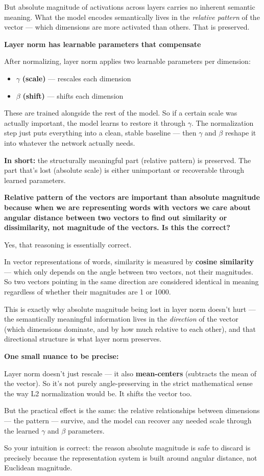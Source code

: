 But absolute magnitude of activations across layers carries no inherent semantic meaning. What the model encodes semantically lives in the \textit{relative pattern} of the vector --- which dimensions are more activated than others. That is preserved.

\bigskip
\textbf{Layer norm has learnable parameters that compensate}

After normalizing, layer norm applies two learnable parameters per dimension:

\begin{itemize}
    \item $\gamma$ \textbf{(scale)} --- rescales each dimension
    \item $\beta$ \textbf{(shift)} --- shifts each dimension
\end{itemize}

These are trained alongside the rest of the model. So if a certain scale was actually important, the model learns to restore it through $\gamma$. The normalization step just puts everything into a clean, stable baseline --- then $\gamma$ and $\beta$ reshape it into whatever the network actually needs.

\bigskip
\textbf{In short:} the structurally meaningful part (relative pattern) is preserved. The part that's lost (absolute scale) is either unimportant or recoverable through learned parameters.


\bigskip\bigskip
\textbf{Relative pattern of the vectors are important than absolute magnitude because when we are representing words with vectors we care about angular distance between two vectors to find out similarity or dissimilarity, not magnitude of the vectors. Is this the correct?}

Yes, that reasoning is essentially correct.

In vector representations of words, similarity is measured by \textbf{cosine similarity} --- which only depends on the angle between two vectors, not their magnitudes. So two vectors pointing in the same direction are considered identical in meaning regardless of whether their magnitudes are 1 or 1000.

This is exactly why absolute magnitude being lost in layer norm doesn't hurt --- the semantically meaningful information lives in the \textit{direction} of the vector (which dimensions dominate, and by how much relative to each other), and that directional structure is what layer norm preserves.

\bigskip
\textbf{One small nuance to be precise:}

Layer norm doesn't just rescale --- it also \textbf{mean-centers} (subtracts the mean of the vector). So it's not purely angle-preserving in the strict mathematical sense the way L2 normalization would be. It shifts the vector too.

But the practical effect is the same: the relative relationships between dimensions --- the pattern --- survive, and the model can recover any needed scale through the learned $\gamma$ and $\beta$ parameters.

\bigskip
So your intuition is correct: the reason absolute magnitude is safe to discard is precisely because the representation system is built around angular distance, not Euclidean magnitude.